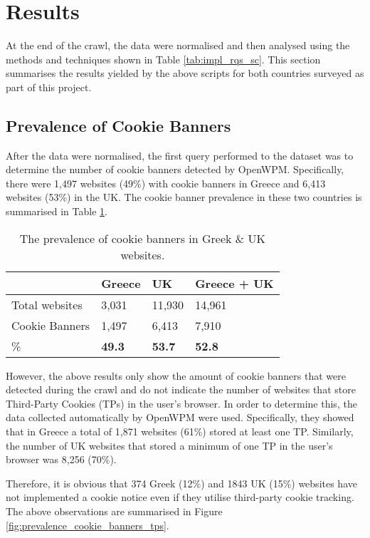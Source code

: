 \documentclass[../main.tex]{subfiles}
\begin{document}
\section{Results}
At the end of the crawl, the data were normalised and then analysed using the methods and techniques shown in Table \ref{tab:impl_rqs_sc}. This section summarises the results yielded by the above scripts for both countries surveyed as part of this project.

\subsection{Prevalence of Cookie Banners}
After the data were normalised, the first query performed to the dataset was to determine the number of cookie banners detected by OpenWPM. Specifically, there were 1,497 websites (49\%) with cookie banners in Greece and 6,413 websites (53\%) in the UK. The cookie banner prevalence in these two countries is summarised in Table \ref{tab:res_cookies_prevalence}.

\begin{table}[ht]
    \centering
    \begin{tabular}{@{}llll@{}}
    \toprule
                   & Greece        & UK            & Greece + UK   \\ \midrule
    Total websites & 3,031         & 11,930        & 14,961        \\
    Cookie Banners & 1,497         & 6,413         & 7,910         \\
    \%             & \textbf{49.3} & \textbf{53.7} & \textbf{52.8} \\ \bottomrule
    \end{tabular}
    \caption{The prevalence of cookie banners in Greek \& UK websites.}
    \label{tab:res_cookies_prevalence}
\end{table}

However, the above results only show the amount of cookie banners that were detected during the crawl and do not indicate the number of websites that store Third-Party Cookies (TPs) in the user’s browser. In order to determine this, the data collected automatically by OpenWPM were used. Specifically, they showed that in Greece a total of 1,871 websites (61\%) stored at least one TP. Similarly, the number of UK websites that stored a minimum of one TP in the user’s browser was 8,256 (70\%).

Therefore, it is obvious that 374 Greek (12\%) and 1843 UK (15\%) websites have not implemented a cookie notice even if they utilise third-party cookie tracking. The above observations are summarised in Figure \ref{fig:prevalence_cookie_banners_tps}.
\end{document}
